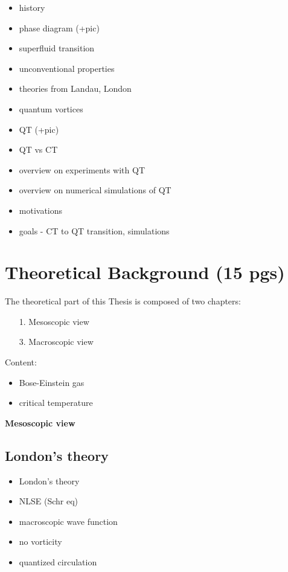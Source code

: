 \documentclass[a4paper, 12pt]{report}
\newcommand{\<}{\langle} %
\renewcommand{\>}{\rangle} %
\begin{document}
\begin{itemize}

	\item history
	\item phase diagram (+pic)
	\item superfluid transition
	\item unconventional properties
	\item theories from Landau, London
	\item quantum vortices
	\item QT (+pic)
	\item QT vs CT
	\item overview on experiments with QT
	\item overview on numerical simulations of QT
	\item motivations
	\item goals - CT to QT transition, simulations
	
\end{itemize}

\newpage
\chapter{Theoretical Background (15 pgs)}

The theoretical part of this Thesis is composed of two chapters:

\begin{itemize}
	\item[1.] Mesoscopic view

	\item[3.] Macroscopic view

\end{itemize}

Content:

\begin{itemize}
	\item Bose-Einstein gas
	\item critical temperature
\end{itemize}

\vspace{1cm}

\newpage

{\Huge \bfseries Mesoscopic view}
\vspace{0.3cm}

\section{London's theory}
\begin{itemize}
	\item London's theory
	\item NLSE (Schr eq)
	\item macroscopic wave function
	\item no vorticity
	\item quantized circulation
\end{itemize}
\end{document}
